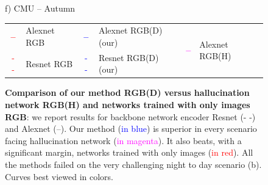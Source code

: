 \begin{figure}
\begin{minipage}{0.27\linewidth}
		f) CMU -- Autumn
	\end{minipage}
	
	\vspace{0.2cm}
	
	\begin{scriptsize}
	\begin{tabular}{c l c l c l }
		\textcolor{red}{\Large{\textbf{--}}} & Alexnet RGB & \textcolor{blue}{\Large{\textbf{--}}} & Alexnet RGB(D) (our) & 
		\multirow{2}{*}{\textcolor{magenta}{\textbf{\Large{--}}}} & \multirow{2}{*}{Alexnet RGB(H)}\\
		\textcolor{red}{\Large{- -}} & Resnet RGB & \textcolor{blue}{\Large{- -}} & Resnet RGB(D) (our) 
	\end{tabular}		
	\end{scriptsize}
	
	\caption[Comparison of our method versus competitors]{\label{fig:results} \textbf{Comparison of our method RGB(D) versus hallucination network RGB(H) and networks trained with only images RGB}: we report results for backbone network encoder Resnet (- -) and Alexnet (--). Our method (\textcolor{blue}{in blue}) is superior in every scenario facing hallucination network (\textcolor{magenta}{in magenta}). It also beats, with a significant margin, networks trained with only images (\textcolor{red}{in red}). All the methods failed on the very challenging night to day scenario (b). Curves best viewed in colors.}
\end{figure}